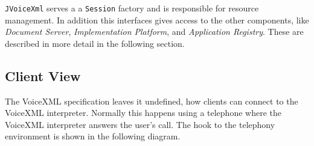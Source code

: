 \documentclass[11pt,a4paper]{article}
\begin{document}
\begin{center}
\end{center}

\texttt{JVoiceXml} serves a a \texttt{Session} factory and is responsible
for resource management. In addition this interfaces gives access to the other
components, like \emph{Document Server}, \emph{Implementation Platform}, and
\emph{Application Registry}. These are described in more detail in the following
section.

\subsection{Client View}
\label{sec:client-view}

The VoiceXML specification leaves it undefined, how clients can connect to the
VoiceXML interpreter. Normally this happens using a telephone where the VoiceXML
interpreter answers the user's call. The hook to the telephony environment is
shown in the following diagram.
\end{document}
